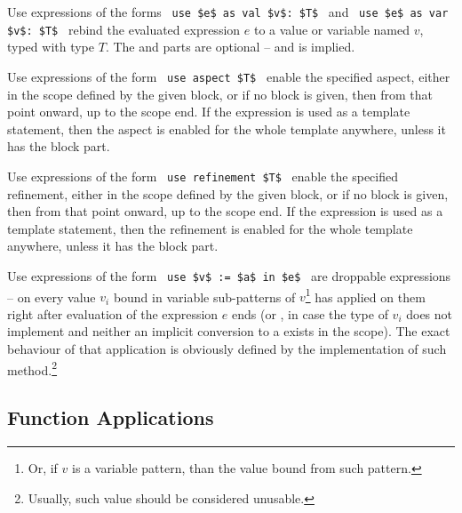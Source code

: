 Use expressions of the forms ~\lstinline!use $e$ as val $v$: $T$!~ and ~\lstinline!use $e$ as var $v$: $T$!~ rebind the evaluated expression $e$ to a value or variable named $v$, typed with type $T$. The  and  parts are optional -- and  is implied. 

Use expressions of the form ~\lstinline!use aspect $T$!~ enable the specified aspect, either in the scope defined by the given block, or if no block is given, then from that point onward, up to the scope end. If the expression is used as a template statement, then the aspect is enabled for the whole template anywhere, unless it has the block part. 

Use expressions of the form ~\lstinline!use refinement $T$!~ enable the specified refinement, either in the scope defined by the given block, or if no block is given, then from that point onward, up to the scope end. If the expression is used as a template statement, then the refinement is enabled for the whole template anywhere, unless it has the block part.

Use expressions of the form ~\lstinline!use $v$ := $a$ in $e$!~ are droppable expressions -- on every value $v_i$ bound in variable sub-patterns of $v$\footnote{Or, if $v$ is a variable pattern, than the value bound from such pattern.} has  applied on them right after evaluation of the expression $e$ ends (or , in case the type of $v_i$ does not implement  and neither an implicit conversion to a  exists in the scope). The exact behaviour of that application is obviously defined by the implementation of such method.\footnote{Usually, such value should be considered unusable.}







\subsection{Function Applications}
\label{sec:function-applications}

